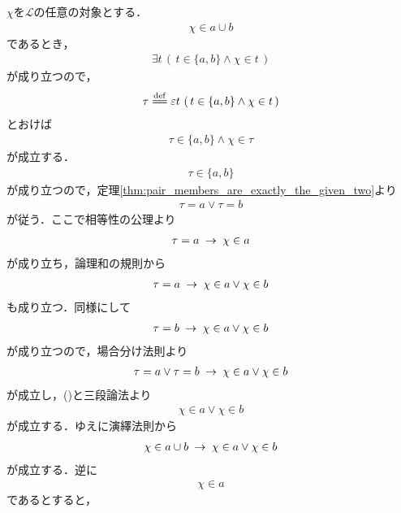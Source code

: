 	\begin{sketch}
		$\chi$を$\mathcal{L}$の任意の対象とする．
		\begin{align}
			\chi \in a \cup b
		\end{align}
		であるとき，
		\begin{align}
			\exists t\, \left(\, t \in \{a,b\} \wedge \chi \in t\, \right)
		\end{align}
		が成り立つので，
		\begin{align}
			\tau \defeq \varepsilon t\, \left(\, t \in \{a,b\} \wedge \chi \in t\, \right)
		\end{align}
		とおけば
		\begin{align}
			\tau \in \{a,b\} \wedge \chi \in \tau
		\end{align}
		が成立する．
		\begin{align}
			\tau \in \{a,b\}
		\end{align}
		が成り立つので，定理\ref{thm:pair_members_are_exactly_the_given_two}より
		\begin{align}
			\tau = a \vee \tau = b
			\label{fom:thm_union_of_pair_is_union_of_their_elements_1}
		\end{align}
		が従う．ここで相等性の公理より
		\begin{align}
			\tau = a \hspace{0.25em}\rightarrow\hspace{0.25em} \chi \in a
		\end{align}
		が成り立ち，論理和の規則から
		\begin{align}
			\tau = a \hspace{0.25em}\rightarrow\hspace{0.25em} \chi \in a \vee \chi \in b
		\end{align}
		も成り立つ．同様にして
		\begin{align}
			\tau = b \hspace{0.25em}\rightarrow\hspace{0.25em} \chi \in a \vee \chi \in b
		\end{align}
		が成り立つので，場合分け法則より
		\begin{align}
			\tau = a \vee \tau = b \hspace{0.25em}\rightarrow\hspace{0.25em} \chi \in a \vee \chi \in b
		\end{align}
		が成立し，()と三段論法より
		\begin{align}
			\chi \in a \vee \chi \in b
		\end{align}
		が成立する．ゆえに演繹法則から
		\begin{align}
			\chi \in a \cup b \hspace{0.25em}\rightarrow\hspace{0.25em} \chi \in a \vee \chi \in b
			\label{fom:thm_union_of_pair_is_union_of_their_elements_2}
		\end{align}
		が成立する．逆に
		\begin{align}
			\chi \in a
		\end{align}
		であるとすると，

\end{sketch}
